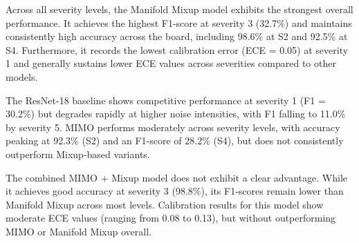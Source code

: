 \begin{table}[htbp]
\centering
{}
\caption[Classification and calibration performance under Gaussian noise]{Classification and calibration performance under Gaussian noise corruption at severity levels 1 to 5. S1–S5 denote severity levels.}
\label{tab:gaussian_noise}
\end{table}

Across all severity levels, the Manifold Mixup model exhibits the strongest overall performance. It achieves the highest F1-score at severity 3 (32.7\%) and maintains consistently high accuracy across the board, including 98.6\% at S2 and 92.5\% at S4. Furthermore, it records the lowest calibration error (ECE = 0.05) at severity 1 and generally sustains lower ECE values across severities compared to other models.

The ResNet-18 baseline shows competitive performance at severity 1 (F1 = 30.2\%) but degrades rapidly at higher noise intensities, with F1 falling to 11.0\% by severity 5. MIMO performs moderately across severity levels, with accuracy peaking at 92.3\% (S2) and an F1-score of 28.2\% (S4), but does not consistently outperform Mixup-based variants.

The combined MIMO + Mixup model does not exhibit a clear advantage. While it achieves good accuracy at severity 3 (98.8\%), its F1-scores remain lower than Manifold Mixup across most levels. Calibration results for this model show moderate ECE values (ranging from 0.08 to 0.13), but without outperforming MIMO or Manifold Mixup overall.

